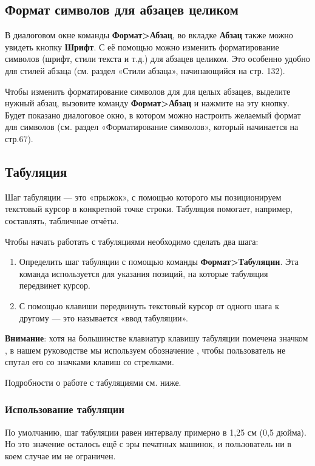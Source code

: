 \documentclass[a4paper,10pt]{article}
\begin{document}
\subsection{Формат символов для абзацев целиком}
В диалоговом окне команды \textbf{Формат>Абзац}, во вкладке \textbf{Абзац} также можно увидеть кнопку \textbf{Шрифт}. С её помощью можно изменить форматирование символов (шрифт, стили текста и т.д.) для абзацев целиком. Это особенно удобно для стилей абзаца (см. раздел «Стили абзаца», начинающийся на стр. 132).

Чтобы изменить форматирование символов для для целых абзацев, выделите нужный абзац, вызовите команду \textbf{Формат>Абзац} и нажмите на эту кнопку. Будет показано диалоговое окно, в котором можно настроить желаемый формат для символов (см. раздел «Форматирование символов», который начинается на стр.67).

\subsection{Табуляция}
Шаг табуляции --- это «прыжок», с помощью которого мы позиционируем текстовый курсор в конкретной точке строки. Табуляция помогает, например, составлять, табличные отчёты. 

Чтобы начать работать с табуляциями необходимо сделать два шага:
\begin{enumerate}
 \item Определить шаг табуляции с помощью команды \textbf{Формат>Табуляции}. Эта команда используется для указания позиций, на которые табуляция передвинет курсор.
 \item С помощью клавиши  передвинуть текстовый курсор от одного шага к другому --- это называется «ввод табуляции».
\end{enumerate}

\textbf{Внимание}: хотя на большинстве клавиатур клавишу табуляции помечена значком  , в нашем руководстве мы используем обозначение , чтобы  пользователь не спутал его со значками клавиш со стрелками.

Подробности о работе с табуляциями см. ниже.

\subsubsection{Использование табуляции}
По умолчанию, шаг табуляции равен интервалу примерно в 1,25 см (0,5 дюйма). Но это значение осталось ещё с эры печатных машинок, и пользователь ни в коем случае им не ограничен.
\end{document}
